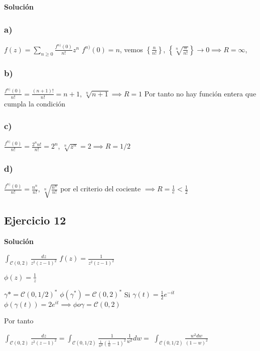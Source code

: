 \textbf{Solución}
\subsubsection{a)}
$f(z) = \sum_{n\geq 0} \frac{f^{n)}(0)}{n!} z^n$
$ f^{n)}(0) = n$, vemos $\left\{ \frac{n}{n!} \right\}$,  $\left\{ \sqrt[n]{\frac{n}{n!}} \right\} \rightarrow 0 \implies R = \infty$,


\subsubsection{b)} 
$\frac{f^{n)}(0)}{n!} = \frac{(n+1)!}{n!} = n+1$, $\sqrt[n]{n+1} \implies R=1$
Por tanto no hay función entera que cumpla la condición

\subsubsection{c)}
$\frac{f^{n)}(0)}{n!} = \frac{2^n n!}{n!} = 2^n$, $\sqrt[n]{z^n} = 2 \implies R=1/2$

\subsubsection{d)}
$\frac{f^{n)}(0)}{n!} = \frac{n^n}{n!}$, $\sqrt[n]{ \frac{n^n}{n!} }$ por el criterio del cociente
$\implies R=\frac{1}{e} < \frac{1}{2}$



\subsection{Ejercicio 12}

\textbf{Solución}

$\int_{\mathcal{C}(0,2)} \frac{dz}{z^2(z-1)^2}$
$f(z) = \frac{1}{z^2(z-1)^2}$

$\phi(z) = \frac{1}{z}$

$\gamma{\ast} = \mathcal{C}(0,1/2)^{\ast}$
$\phi(\gamma^{\ast}) = \mathcal{C}(0,2)^{\ast}$
Si $\gamma(t) = \frac{1}{2}e^{-it}$
$\phi(\gamma(t)) = 2e^{it}\implies \phi o \gamma = \mathcal{C}(0,2)$ 

Por tanto

$\int_{\mathcal{C}(0,2)} \frac{dz}{z^2(z-1)^2} = \int_{\mathcal{C}(0,1/2)} \frac{1}{ \frac{1}{w^2} (\frac{1}{w}-1)^2} \frac{1}{w^2} dw =$
$\int_{\mathcal{C}(0,1/2)} \frac{w^2dw}{(1-w)^2}$